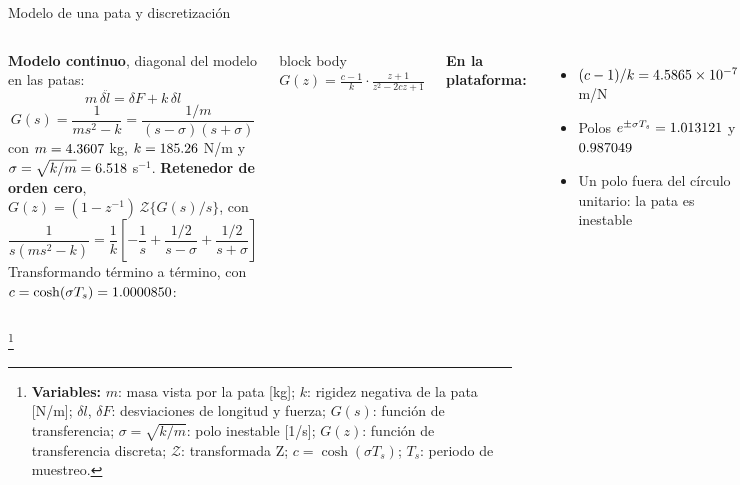 \documentclass[aspectratio=169,10pt]{beamer}
\newcommand{\variables}[1]{\begingroup\renewcommand{\thefootnote}{}\footnote[frame]{\textbf{Variables:} #1}\addtocounter{footnote}{-1}\endgroup}
\newcommand{\resultado}[1]{\par\smallskip\begin{beamercolorbox}[rounded=true,sep=0.45em,center]{block body}#1\end{beamercolorbox}\par\smallskip}
\newcommand{\valores}{{\color{acento}\textbf{En la plataforma:}}\ }
\begin{document}
\begin{frame}{Modelo de una pata y discretización}
\small
\begin{columns}[T]
\textbf{Modelo continuo}, diagonal del modelo en las patas:
\[
m\,\delta\ddot l = \delta F + k\,\delta l
\]
\[
G(s) = \frac{1}{ms^2 - k} = \frac{1/m}{(s - \sigma)(s + \sigma)}
\]
con $m = 4.3607$ kg, $k = 185.26$ N/m y $\sigma = \sqrt{k/m} = 6.518$ s$^{-1}$.
\textbf{Retenedor de orden cero}, $G(z) = (1 - z^{-1})\,\mathcal Z\{G(s)/s\}$, con
\[
\frac{1}{s(ms^2 - k)} = \frac1k\left[-\frac1s + \frac{1/2}{s - \sigma} + \frac{1/2}{s + \sigma}\right]
\]
Transformando término a término, con $c = \cosh(\sigma T_s) = 1.0000850$:
\resultado{$\displaystyle G(z) = \frac{c - 1}{k}\cdot\frac{z + 1}{z^2 - 2cz + 1}$}
\valores
\begin{itemize}
\setlength{\itemsep}{0.2em}
\item $(c - 1)/k = 4.5865\times10^{-7}$ m/N
\item Polos $e^{\pm\sigma T_s} = 1.013121$ y $0.987049$
\item Un polo fuera del círculo unitario: la pata es inestable
\end{itemize}
\end{columns}
\variables{$m$: masa vista por la pata [kg]; $k$: rigidez negativa de la pata [N/m]; $\delta l$, $\delta F$: desviaciones de longitud y fuerza; $G(s)$: función de transferencia; $\sigma = \sqrt{k/m}$: polo inestable [1/s]; $G(z)$: función de transferencia discreta; $\mathcal Z$: transformada Z; $c = \cosh(\sigma T_s)$; $T_s$: periodo de muestreo.}
\end{frame}
\end{document}
